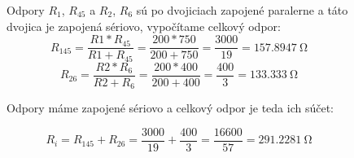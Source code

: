 \begin{figure}[!ht]
\begin{center}
    
    Odpory $R_1$, $R_{45}$ a $R_2$, $R_6$ sú po dvojiciach zapojené paralerne a táto dvojica je zapojená sériovo, vypočítame celkový odpor:
    \[
        R_{145} = \frac{R1 * R_{45}}{R1 + R_{45}} = 
        \frac{200 * 750}{200 + 750} = \frac{3000}{19} = \SI{157,8947}{\ohm}
    \]
    \[
        R_{26} = \frac{R2 * R_6}{R2 + R_6} = 
        \frac{200 * 400}{200 + 400} = \frac{400}{3} = \SI{133,333}{\ohm}
    \]
    
    Odpory máme zapojené sériovo a celkový odpor je teda ich súčet:
    
    \[
        R_i = R_{145} + R_{26} = 
        \frac{3000}{19} + \frac{400}{3} = \frac{16600}{57} = \SI{291,2281}{\ohm}
    \]
\end{center}
\end{figure} 